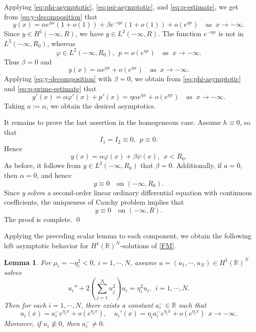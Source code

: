 \documentclass[11pt]{article}
\numberwithin{equation}{section}
\newtheorem{lemma}[theorem]{Lemma}
\theoremstyle{definition}
\begin{document}
Applying \eqref{eq:phi-asymptotic}, \eqref{eq:psi-asymptotic}, and
\eqref{eq:p-estimate}, we get from \eqref{eq:y-decomposition} that
\[
y(x)
=
\alpha e^{\eta x}(1+o(1))
+
\beta e^{-\eta x}(1+o(1))
+
o(e^{\eta x})\quad \text{as }\ x\to-\infty.
\]
Since \(y\in H^1(-\infty,R)\), we have \(y\in L^2(-\infty,R)\).
The function \(e^{-\eta x}\) is not in \(L^2(-\infty,R_0)\), whereas
\[
\varphi\in L^2(-\infty,R_0),
\ \
p=o(e^{\eta x})\quad \text{as }\ x\to-\infty.
\]
Thus \(\beta=0\) and
\[
y(x)=\alpha e^{\eta x}+o(e^{\eta x})\quad \text{as }\ x\to-\infty.
\]
Applying \eqref{eq:y-decomposition} with \(\beta=0\), we obtain from
\eqref{eq:phi-asymptotic} and \eqref{eq:p-prime-estimate} that
\[
y'(x)
=
\alpha\varphi'(x)+p'(x)
=
\eta\alpha e^{\eta x}+o(e^{\eta x})\quad \text{as }\ x\to-\infty.
\]
Taking \(a:=\alpha\), we obtain the desired asymptotics.
	



It remains  to prove the last assertion in the homogeneous case. Assume
\(h\equiv0\), so that
\[
I_1=I_2\equiv0,
\ \
p\equiv0.
\]
Hence
\[
y(x)=\alpha\varphi(x)+\beta\psi(x),
\ \  x<R_0 .
\]
As before, it follows from \(y\in L^2(-\infty,R_0)\)   that \(\beta=0\). Additionally, if
\(a=0\), then \(\alpha=0\), and hence
\[
y\equiv0
\quad\text{on }(-\infty,R_0).
\]
Since \(y\) solves a second-order linear ordinary differential equation with
continuous coefficients, the uniqueness of Cauchy problem implies that
\[
y\equiv0
\quad\text{on }(-\infty,R).
\]
The proof is complete.
\qed



















Applying the preceding scalar lemma to each component, we obtain the following left asymptotic behavior for \(H^1(\mathbb R)^N\)-solutions of \eqref{FM}.



\begin{lemma}
\label{lem:left-asymptotic}
For \(\mu_i=-\eta_i^2<0\), \(i=1,\cdots,N\), assume
$u=(u_1,\cdots,u_N)\in H^1(\mathbb R)^N$
solves
\[
u_i''+2\left(\sum_{j=1}^N u_j^2\right)u_i
=
\eta_i^2u_i,
\ \  i=1,\cdots,N.
\]
Then for each \(i=1,\cdots,N\), there exists a constant
\(a_i^-\in\mathbb R\) such that
\[
u_i(x)=a_i^- e^{\eta_i x}+o(e^{\eta_i x}),\quad
u_i'(x)=\eta_i a_i^- e^{\eta_i x}+o(e^{\eta_i x})\ \  x\to-\infty.
\]
Moreover, if \(u_i\not\equiv0\), then
$a_i^-\neq0$.

\end{lemma}
\end{document}
